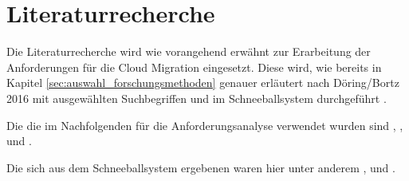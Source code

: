 \section{Literaturrecherche}
Die Literaturrecherche wird wie vorangehend erwähnt zur Erarbeitung der Anforderungen für die Cloud Migration eingesetzt. Diese wird, wie bereits in Kapitel \ref{sec:auswahl_forschungsmethoden} genauer erläutert nach Döring/Bortz 2016 mit ausgewählten Suchbegriffen und im Schneeballsystem durchgeführt \cite[S. 158ff]{Doering2016}.

Die \grqq{} \cite[S. 158]{Doering2016} die im Nachfolgenden für die Anforderungsanalyse verwendet wurden sind \grqq{}, \grqq{}, \grqq{} und \grqq{}.

Die sich aus dem Schneeballsystem ergebenen \grqq{} \cite[S. 158]{Doering2016} waren hier unter anderem \grqq{}, \grqq{} und \grqq{}. \pagebreak